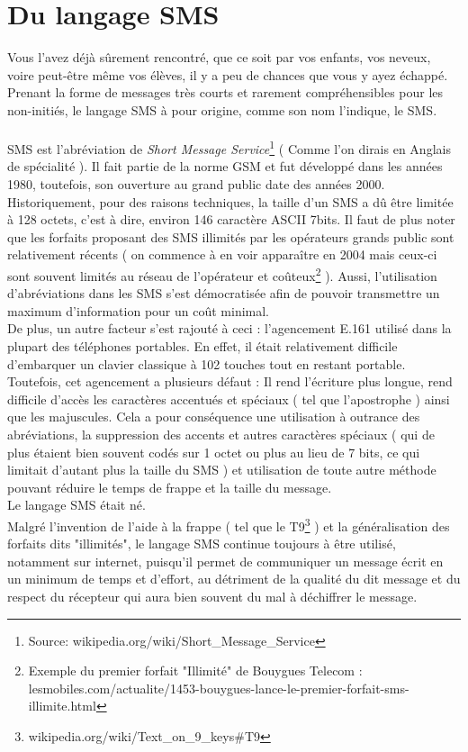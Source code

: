 \documentclass[11pt]{report}
\begin{document}
	\section{Du langage SMS}
	Vous l'avez déjà sûrement rencontré, que ce soit par vos enfants, vos neveux, voire peut-être même vos élèves, il y a peu de chances que vous y ayez échappé. Prenant la forme de messages très courts et rarement compréhensibles pour les non-initiés, le langage SMS à pour origine, comme son nom l'indique, le SMS.
	\paragraph{}
	SMS est l'abréviation de {\em Short Message Service}\footnote{Source: wikipedia.org/wiki/Short\_Message\_Service} ( Comme l'on dirais en Anglais de spécialité ). Il fait partie de la norme GSM et fut développé dans les années 1980, toutefois, son ouverture au grand public date des années 2000. Historiquement, pour des raisons techniques, la taille d'un SMS a dû être limitée à 128 octets, c'est à dire, environ 146 caractère ASCII 7bits. Il faut de plus noter que les forfaits proposant des SMS illimités par les opérateurs grands public sont relativement récents ( on commence à en voir apparaître en 2004 mais ceux-ci sont souvent limités au réseau de l'opérateur et coûteux\footnote{Exemple du premier forfait "Illimité" de Bouygues Telecom : lesmobiles.com/actualite/1453-bouygues-lance-le-premier-forfait-sms-illimite.html} ). Aussi, l'utilisation d'abréviations dans les SMS s'est démocratisée afin de pouvoir transmettre un maximum d'information pour un coût minimal.\\
	De plus, un autre facteur s'est rajouté à ceci : l'agencement E.161 utilisé dans la plupart des téléphones portables. En effet, il était relativement difficile d'embarquer un clavier classique à 102 touches tout en restant portable. Toutefois, cet agencement a plusieurs défaut : Il rend l'écriture plus longue, rend difficile d'accès les caractères accentués et spéciaux ( tel que l'apostrophe ) ainsi que les majuscules. Cela a pour conséquence une utilisation à outrance des abréviations, la suppression des accents et autres caractères spéciaux ( qui de plus étaient bien souvent codés sur 1 octet ou plus au lieu de 7 bits, ce qui limitait d'autant plus la taille du SMS ) et utilisation de toute autre méthode pouvant réduire le temps de frappe et la taille du message.\\
	Le langage SMS était né.\\
	Malgré l'invention de l'aide à la frappe ( tel que le T9\footnote{wikipedia.org/wiki/Text\_on\_9\_keys\#T9} ) et la généralisation des forfaits dits "illimités", le langage SMS continue toujours à être utilisé, notamment sur internet, puisqu'il permet de communiquer un message écrit en un minimum de temps et d'effort, au détriment de la qualité du dit message et du respect du récepteur qui aura bien souvent du mal à déchiffrer le message.\\
\end{document}
